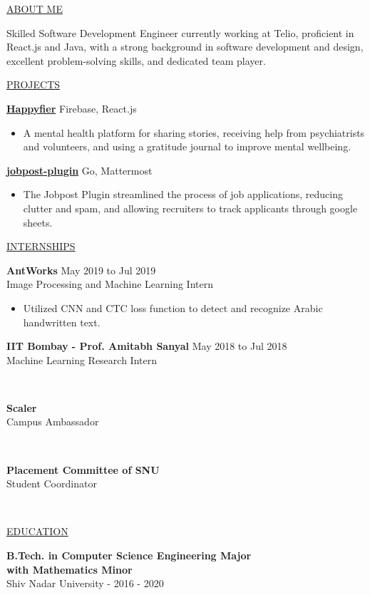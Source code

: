 \documentclass[11pt]{article}
\newcommand{\betteruline}[1]{
    \uline{#1}
}
\newcommand{\sectiontitle}[1]{
    \begingroup
        \titlebold
        \betteruline{\Large\uppercase{#1}  }
        \vspace{1.7mm}
    \endgroup
}
\newcommand{\sectioncontent}[1]{
    \begingroup
        \begin{FlushLeft}
        \vspace{-3mm}
        \sffamily\small#1
        \end{FlushLeft}
    \endgroup
    \vspace{2mm}
}
\newcommand{\job}[4]{
    \begingroup
        \textbf{\small#1}
        \hfill\color{black!70}\small{#3}
        \\
        \small#2
        \hfill\color{black!70}\small{#4}
    \endgroup
}
\newcommand{\project}[2]{
    \begingroup
        \textbf{\small#1}
        \hfill\color{black!70}\small{#2}
    \endgroup
}
\newcommand{\spacevv}{
    \vspace{2mm}
}
\begin{document}
    \setlength{\columnsep}{5mm}
    \begin{paracol}{2}

    \sectiontitle{about me}
    \sectioncontent{
        Skilled Software Development Engineer currently working at Telio, proficient in React.js and Java, with a strong background in software development and design, excellent problem-solving skills, and dedicated team player.
    }

    \sectiontitle{projects}
    \sectioncontent{
        \project{\href{https://happyfier.firebaseapp.com/}{Happyfier}}{Firebase, React.js}
        \begin{itemize}
            \item  A mental health platform for sharing stories, receiving help from psychiatrists and volunteers, and using a gratitude journal to improve mental wellbeing. 
        \end{itemize}
        \spacevv
       
        \project{\href{https://www.github.com/rr250/jobpost-plugin}{jobpost-plugin}}{Go, Mattermost}
        \begin{itemize}
            \item  The Jobpost Plugin streamlined the process of job applications, reducing clutter and spam, and allowing recruiters to track applicants
through google sheets. 
        \end{itemize}
        \spacevv
    }

    \sectiontitle{Internships}
    \sectioncontent{

      \job{
AntWorks}{Image Processing and Machine Learning Intern}{May 2019 to Jul 2019}{}
      \begin{itemize}
        \item Utilized CNN and CTC loss function to detect and recognize Arabic handwritten text.  
      \end{itemize}
      \spacevv

      \job{IIT Bombay - Prof. Amitabh Sanyal}{Machine Learning Research Intern}{May 2018 to Jul 2018}{}
      \\
      \spacevv
      \job{Scaler}{Campus Ambassador}{}{}
      \\
      \spacevv
      \job{Placement Committee of SNU}{Student Coordinator}{}{}
      \\
      \spacevv
    }

    \sectiontitle{education}
    \sectioncontent{
        \textbf{B.Tech. in Computer Science Engineering Major \\with Mathematics Minor} \\
        Shiv Nadar University - 
        \textcolor{black!70}{2016 - 2020} \\
    }


\end{paracol}
\end{document}
